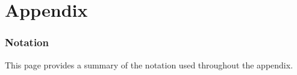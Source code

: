 \documentclass[twoside]{article}
\begin{document}



\appendix
\onecolumn

\part*{Appendix}                          %
\localtableofcontents                     %

%
%

\section*{Notation}
\label{sec:notation}

This page provides a summary of the notation used throughout the appendix.
\end{document}
